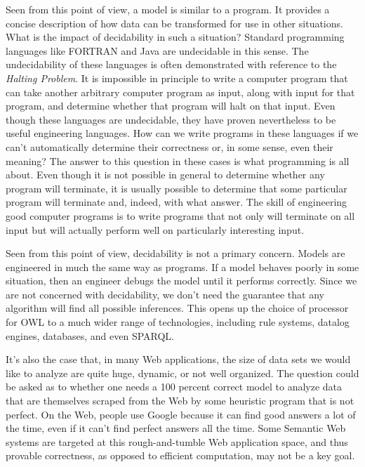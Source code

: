 Seen from this point of view, a model is similar to a program. It
provides a concise description of how data can be transformed for use in
other situations. What is the impact of decidability in such a
situation? Standard programming languages like FORTRAN and Java are
undecidable in this sense. The undecidability of these languages is
often demonstrated with reference to the \emph{Halting Problem}. It is
impossible in principle to write a computer program that can take
another arbitrary computer program as input, along with input for that
program, and determine whether that program will halt on that input.
Even though these languages are undecidable, they have proven
nevertheless to be useful engineering languages. How can we write
programs in these languages if we can't automatically determine their
correctness or, in some sense, even their meaning? The answer to this
question in these cases is what programming is all about. Even though it
is not possible in general to determine whether any program will
terminate, it is usually possible to determine that some particular
program will terminate and, indeed, with what answer. The skill of
engineering good computer programs is to write programs that not only
will terminate on all input but will actually perform well on
particularly interesting input.

Seen from this point of view, decidability is not a primary concern.
Models are engineered in much the same way as programs. If a model
behaves poorly in some situation, then an engineer debugs the model
until it performs correctly. Since we are not concerned with
decidability, we don't need the guarantee that any algorithm will find
all possible inferences. This opens up the choice of processor for OWL
to a much wider range of technologies, including rule systems, datalog
engines, databases, and even SPARQL.

It's also the case that, in many Web applications, the size of data sets
we would like to analyze are quite huge, dynamic, or not well organized.
The question could be asked as to whether one needs a 100 percent
correct model to analyze data that are themselves scraped from the Web
by some heuristic program that is not perfect. On the Web, people use
Google because it can find good answers a lot of the time, even if it
can't find perfect answers all the time. Some Semantic Web systems are
targeted at this rough-and-tumble Web application space, and thus
provable correctness, as opposed to efficient computation, may not be a
key goal.

